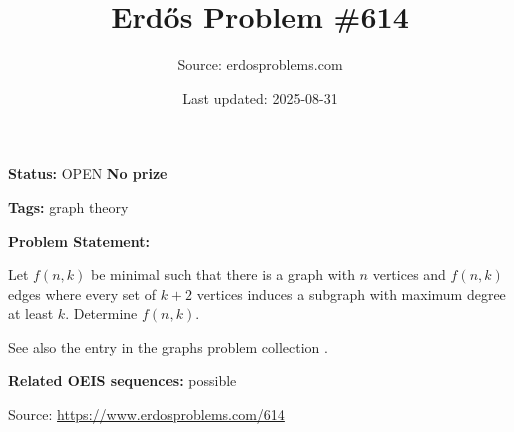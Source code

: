 \documentclass{article}
\title{Erd\H{o}s Problem \#614}
\date{Last updated: 2025-08-31}
\author{Source: erdosproblems.com}
\begin{document}
\maketitle

\noindent\textbf{Status:} OPEN \quad \textbf{No prize}

\noindent\textbf{Tags:} graph theory

\medskip

\noindent\textbf{Problem Statement:}

Let $f(n,k)$ be minimal such that there is a graph with $n$ vertices and $f(n,k)$ edges where every set of $k+2$ vertices induces a subgraph with maximum degree at least $k$. Determine $f(n,k)$.




See also the entry in the graphs problem collection .

\noindent\textbf{Related OEIS sequences:} possible


\bigskip
\noindent\small{Source: \url{https://www.erdosproblems.com/614}}
\end{document}
